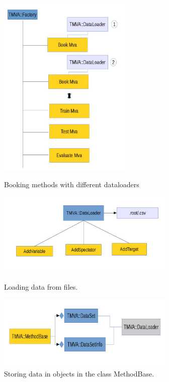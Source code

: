 \documentclass[a4paper]{jpconf}
\begin{document}
\begin{figure}[h]
\begin{minipage}{15pc}
\includegraphics[width=15pc]{img/dl1.jpg}
\caption{\label{dl1}Booking methods with different dataloaders}
\end{minipage}\hspace{2pc}%
\begin{minipage}{15pc}
\includegraphics[width=20pc]{img/dl2.jpg}
\caption{\label{dl2}Loading data from files.}
\includegraphics[width=20pc]{img/dl3.jpg}
\caption{\label{dl3}Storing data in objects in the class MethodBase.}
\end{minipage} 
\end{figure}
\end{document}
